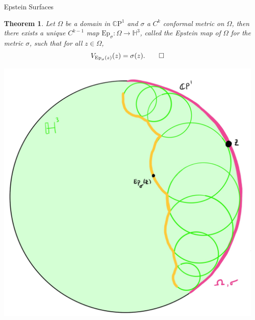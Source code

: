 \documentclass[professionalfont]{beamer}
\newcommand{\CP}{\mathbb{C}\mathrm{P}}
\renewcommand{\H}{\mathbb{H}}
\newtheorem{thm}{Theorem}[section]
\begin{document}
\begin{frame}{Epstein Surfaces}


\begin{thm}
Let $\Omega$ be a domain in $\CP^1$  and $\sigma$ a $C^k$ conformal metric on $\Omega$, then there exists a unique $C^{k-1}$ map $\mathrm{Ep}_\sigma : \Omega \to \H^3$, called the Epstein map of $\Omega$ for the metric $\sigma$, such that for all $z \in \Omega$,
\[
V_{\mathrm{Ep}_\sigma(z)}(z) = \sigma(z). \qed
\]
\end{thm}


\centering\includegraphics[scale=0.06]{Epstein-4.jpg}

\end{frame}


\end{document}
